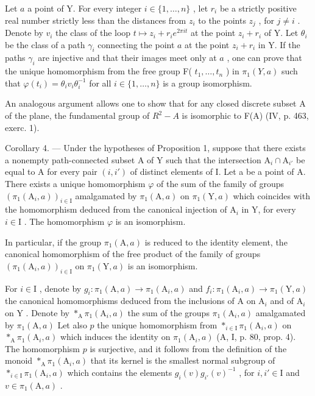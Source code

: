 Let \(a\) a point of Y. For every integer \(i \in \{1, \ldots, n\}\) , let \(r_i\) be a strictly positive real number strictly less than the distances from \(z_i\) to the points \(z_j\) , for \(j \neq i\) . Denote by \(v_i\) the class of the loop \(t \mapsto z_i + r_i e^{2\pi it}\) at the point \(z_i + r_i\) of Y. Let \(\theta_i\) be the class of a path \(\gamma_i\) connecting the point \(a\) at the point \(z_i + r_i\) in Y. If the paths \(\gamma_i\) are injective and that their images meet only at \(a\) , one can prove that the unique homomorphism from the free group F( \(t_1, \ldots, t_n\) ) in \(\pi_1(Y, a)\) such that \(\varphi(t_i) = \theta_i v_i \theta_i^{-1}\) for all \(i \in \{1, \ldots, n\}\) is a group isomorphism.

An analogous argument allows one to show that for any closed discrete subset A of the plane, the fundamental group of \(R^{2}-A\) is isomorphic to F(A) (IV, p. 463, exerc. 1).

Corollary 4. --- Under the hypotheses of Proposition 1, suppose that there exists a nonempty path-connected subset A of Y such that the intersection \(\mathrm{A}_i \cap \mathrm{A}_{i'}\) be equal to A for every pair \((i, i')\) of distinct elements of I. Let a be a point of A. There exists a unique homomorphism \(\varphi\) of the sum of the family of groups \((\pi_1(\mathrm{A}_i, a))_{i \in \mathrm{I}}\) amalgamated by \(\pi_1(\mathrm{A}, a)\) on \(\pi_1(\mathrm{Y}, a)\) which coincides with the homomorphism deduced from the canonical injection of \(\mathrm{A}_i\) in Y, for every \(i \in \mathrm{I}\) . The homomorphism \(\varphi\) is an isomorphism.

In particular, if the group \(\pi_{1}(\mathrm{A},a)\) is reduced to the identity element, the canonical homomorphism of the free product of the family of groups \((\pi_1(\mathrm{A}_i,a))_{i\in \mathrm{I}}\) on \(\pi_1(\mathrm{Y},a)\) is an isomorphism.

For \(i \in \mathrm{I}\) , denote by \(g_i \colon \pi_1(\mathrm{A}, a) \to \pi_1(\mathrm{A}_i, a)\) and \(f_i \colon \pi_1(\mathrm{A}_i, a) \to \pi_1(\mathrm{Y}, a)\) the canonical homomorphisms deduced from the inclusions of \(\mathrm{A}\) on \(\mathrm{A}_i\) and of \(\mathrm{A}_i\) on \(\mathrm{Y}\) . Denote by \(*_{\mathrm{A}} \pi_1(\mathrm{A}_i, a)\) the sum of the groups \(\pi_1(\mathrm{A}_i, a)\) amalgamated by \(\pi_1(\mathrm{A}, a)\) Let also \(p\) the unique homomorphism from \(*_{i \in \mathrm{I}} \pi_1(\mathrm{A}_i, a)\) on \(*_{\mathrm{A}} \pi_1(\mathrm{A}_i, a)\) which induces the identity on \(\pi_1(\mathrm{A}_i, a)\) (A, I, p. 80, prop. 4). The homomorphism \(p\) is surjective, and it follows from the definition of the monoid \(*_{\mathrm{A}} \pi_1(\mathrm{A}_i, a)\) that its kernel is the smallest normal subgroup of \(*_{i \in \mathrm{I}} \pi_1(\mathrm{A}_i, a)\) which contains the elements \(g_i(v)g_{i'}(v)^{-1}\) , for \(i, i' \in \mathrm{I}\) and \(v \in \pi_1(\mathrm{A}, a)\) .

